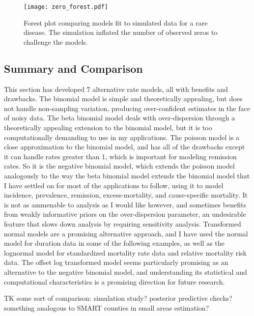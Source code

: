 \begin{figure}
\texttt{[image: zero\_forest.pdf]}
\caption{Forest plot comparing models fit to simulated data for a rare
  disease.  The simulation inflated the number of observed zeros to
  challenge the models.}
\label{zero-forest}
\end{figure}




\subsection{Summary and Comparison}
This section has developed $7$ alternative rate models, all with
benefits and drawbacks.  The binomial model is simple and
theoretically appealing, but does not handle non-sampling variation,
producing over-confident estimates in the face of noisy data.  The
beta binomial model deals with over-dispersion through a theoretically
appealing extension to the binomial model, but it is too
computationally demanding to use in my applications.  The poisson
model is a close approximation to the binomial model, and has all of
the drawbacks except it can handle rates greater than 1, which is
important for modeling remission rates.  So it is the negative
binomial model, which extends the poisson model analogously to the way
the beta binomial model extends the binomial model that I have settled
on for most of the applications to follow, using it to model
incidence, prevalence, remission, excess-mortality, and cause-specific
mortality. It is not as ammenable to analysis as I would like however,
and sometimes benefits from weakly informative priors on the
over-dispersion parameter, an undesirable feature that slows down
analysis by requiring sensitivity analysis.  Transformed normal models
are a promising alternative approach, and I have used the normal model
for duration data in some of the following examples, as well as
the lognormal model for standardized mortality rate data and relative
mortality risk data. The offset log transformed model seems
particularly promising as an alternative to the negative binomial
model, and understanding its statistical and computational
characteristics is a promising direction for future research.

TK some sort of comparison: simulation study? posterior predictive
checks? something analogous to SMART counties in small areas
estimation?
